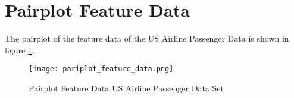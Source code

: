 
  \section{Pairplot Feature Data}
  \label{App:pairplot}
  
  The pairplot of the feature data of the US Airline Passenger Data is shown in
  figure \ref{fig:pairplot_feature}.

  \begin{figure}[h]
		\centering
		\texttt{[image: pariplot\_feature\_data.png]}
		\caption{Pairplot Feature Data US Airline Passenger Data Set}
        \label{fig:pairplot_feature}
  \end{figure}
